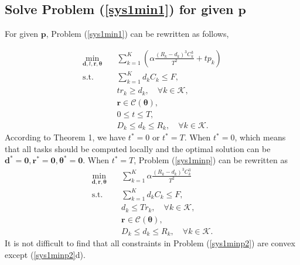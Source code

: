 \documentclass[journal]{IEEEtran}
\begin{document}
\subsection{Solve Problem (\ref{sys1min1}) for given $\pmb p$}
For given $\pmb p$, Problem (\ref{sys1min1}) can be rewritten as follows,

\begin{subequations}\label{sys1minp}
	\begin{align}
	\mathop{\min}_{\pmb d,  t, \pmb r, \pmb \theta}\quad
	&\sum_{k=1}^K (\alpha\frac{(R_{k}-d_{k})^3 C^3_{k}}{T^2}+tp_k)
	\\
	\textrm{s.t.}\quad
	& \sum_{k=1}^K d_{k} C_{k}\leq F,\\
	& tr_k\geq d_k, \quad \forall k\in\mathcal K,\\
	& \pmb r \in \mathcal C(\pmb \theta),\\
	& 0\leq t \leq T,\\
	&  D_{k} \leq d_{k} \leq R_{k}, \quad \forall k\in\mathcal K.
	\end{align}
\end{subequations}
According to Theorem 1, we have $t^*=0$ or $t^*=T$.
When $t^*=0$, which means that all tasks should be computed locally and the optimal solution can be $\pmb d^*=\pmb 0, \pmb r^*=\pmb 0, \pmb \theta^*=\pmb 0$.
When $t^*=T$, Problem (\ref{sys1minp}) can be rewritten as
\begin{subequations}\label{sys1minp2}
	\begin{align}
	\mathop{\min}_{\pmb d, \pmb r, \pmb \theta}\quad
	&\sum_{k=1}^K \alpha\frac{(R_{k}-d_{k})^3 C^3_{k}}{T^2}
	\\
	\textrm{s.t.}\quad
	& \sum_{k=1}^K d_{k} C_{k}\leq F,\\
	& d_k\leq Tr_k, \quad \forall k\in\mathcal K,\\
	& \pmb r \in \mathcal C(\pmb \theta),\\
	&  D_{k} \leq d_{k} \leq R_{k}, \quad \forall k\in\mathcal K.
	\end{align}
\end{subequations}
It is not difficult to find that all constraints in Problem (\ref{sys1minp2}) are convex except (\ref{sys1minp2}d).
%
\end{document}

